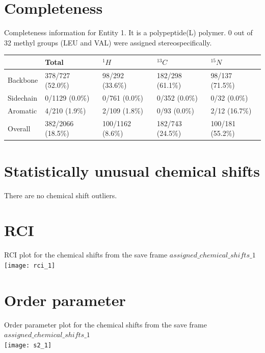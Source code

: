 \section{Completeness}
Completeness information for Entity 1. It is a polypeptide(L) polymer. 0 out of 32 methyl groups (LEU and VAL) were assigned stereospecifically.\begin{longtable}{|l|l|l|l|l|}
\hline
  & Total & $^{1}H$ & $^{13}C$ & $^{15}N$\\\hline
Backbone & 378/727 (52.0\%)& 98/292 (33.6\%)& 182/298 (61.1\%)& 98/137 (71.5\%) \\
\hline
Sidechain & 0/1129 (0.0\%)& 0/761 (0.0\%)& 0/352 (0.0\%)& 0/32 (0.0\%) \\
\hline
Aromatic & 4/210 (1.9\%)& 2/109 (1.8\%)& 0/93 (0.0\%)& 2/12 (16.7\%) \\
\hline
Overall & 382/2066 (18.5\%)& 100/1162 (8.6\%)& 182/743 (24.5\%)& 100/181 (55.2\%) \\
\hline
\end{longtable}

\section{Statistically unusual chemical shifts}
There are no chemical shift outliers.\
\section{RCI}
RCI plot for the chemical shifts from the  save frame $assigned\_chemical\_shifts\_1$\\ \texttt{[image: rci\_1]}\\

\section{Order parameter}
Order parameter plot for the chemical shifts from the  save frame $assigned\_chemical\_shifts\_1$\\ \texttt{[image: s2\_1]}\\

